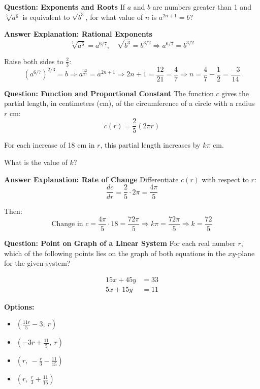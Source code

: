 \documentclass{beamer}
\begin{document}
\begin{frame}{\textbf{Question: Exponents and Roots}}
\small
If $a$ and $b$ are numbers greater than 1 and $\sqrt[7]{a^6}$ is equivalent to $\sqrt{b^3}$, for what value of $n$ is $a^{2n+1} = b$?
\end{frame}

\begin{frame}{\textbf{Answer Explanation: Rational Exponents}}
\small
\[
\sqrt[7]{a^6} = a^{6/7}, \quad \sqrt{b^3} = b^{3/2}
\Rightarrow a^{6/7} = b^{3/2}
\]

Raise both sides to $\frac{2}{3}$:
\[
(a^{6/7})^{2/3} = b
\Rightarrow a^{\frac{12}{21}} = a^{2n+1}
\Rightarrow 2n + 1 = \frac{12}{21} = \frac{4}{7}
\Rightarrow n = \frac{4}{7} - \frac{1}{2} = \frac{-3}{14}
\]
\end{frame}


\begin{frame}{\textbf{Question: Function and Proportional Constant}}
\small
The function $c$ gives the partial length, in centimeters (cm), of the circumference of a circle with a radius $r$ cm:
\[
c(r) = \frac{2}{5}(2\pi r)
\]

For each increase of 18 cm in $r$, this partial length increases by $k\pi$ cm.

What is the value of $k$?
\end{frame}

\begin{frame}{\textbf{Answer Explanation: Rate of Change}}
\small
Differentiate $c(r)$ with respect to $r$:
\[
\frac{dc}{dr} = \frac{2}{5} \cdot 2\pi = \frac{4\pi}{5}
\]

Then:
\[
\text{Change in } c = \frac{4\pi}{5} \cdot 18 = \frac{72\pi}{5}
\Rightarrow k\pi = \frac{72\pi}{5}
\Rightarrow k = \frac{72}{5}
\]

\end{frame}


\begin{frame}{\textbf{Question: Point on Graph of a Linear System}}
\small
For each real number $r$, which of the following points lies on the graph of both equations in the $xy$-plane for the given system?

\[
\begin{aligned}
15x + 45y &= 33 \\
5x + 15y &= 11
\end{aligned}
\]

\textbf{Options:}
\begin{itemize}
    \item[(A)] $\left( \frac{11r}{5} - 3,\ r \right)$
    \item[(B)] $\left( -3r + \frac{11}{5},\ r \right)$
    \item[(C)] $\left( r,\ -\frac{r}{3} - \frac{11}{15} \right)$
    \item[(D)] $\left( r,\ \frac{r}{3} + \frac{11}{15} \right)$
\end{itemize}
\end{frame}
\end{document}
